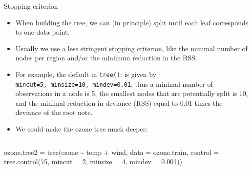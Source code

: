\documentclass[
  10pt,
  ignorenonframetext,
]{beamer}
\newenvironment{Shaded}{\begin{snugshade}}{\end{snugshade}}
\newcommand{\AttributeTok}[1]{\textcolor[rgb]{0.77,0.63,0.00}{#1}}
\newcommand{\DecValTok}[1]{\textcolor[rgb]{0.00,0.00,0.81}{#1}}
\newcommand{\FloatTok}[1]{\textcolor[rgb]{0.00,0.00,0.81}{#1}}
\newcommand{\FunctionTok}[1]{\textcolor[rgb]{0.00,0.00,0.00}{#1}}
\newcommand{\NormalTok}[1]{#1}
\newcommand{\OtherTok}[1]{\textcolor[rgb]{0.56,0.35,0.01}{#1}}
\newcommand{\SpecialCharTok}[1]{\textcolor[rgb]{0.00,0.00,0.00}{#1}}
\providecommand{\tightlist}{%
  \setlength{\itemsep}{0pt}\setlength{\parskip}{0pt}}
\begin{document}
\begin{frame}[fragile]
\begin{block}{Stopping criterion}
\protect\hypertarget{stopping-criterion}{}
\vspace{2mm}

\begin{itemize}
\tightlist
\item
  When building the tree, we can (in principle) split until each leaf
  corresponds to one data point.
\end{itemize}

\vspace{2mm}

\begin{itemize}
\tightlist
\item
  Usually we use a less stringent stopping criterion, like the minimal
  number of nodes per region and/or the minimum reduction in the RSS.
\end{itemize}

\vspace{2mm}

\begin{itemize}
\tightlist
\item
  For example, the default in \texttt{tree()}: is given by
  \texttt{mincut=5,\ minsize=10,\ mindev=0.01}, thus a minimal number of
  observations in a node is 5, the smallest nodes that are potentially
  split is 10, and the minimal reduction in deviance (RSS) equal to 0.01
  times the deviance of the root note.
\end{itemize}

\vspace{2mm}

\begin{itemize}
\tightlist
\item
  We could make the ozone tree much deeper:
\end{itemize}

\(~\)

\scriptsize

\begin{Shaded}
\begin{Highlighting}[]
\NormalTok{ozone.tree2 }\OtherTok{=} \FunctionTok{tree}\NormalTok{(ozone }\SpecialCharTok{\textasciitilde{}}\NormalTok{ temp }\SpecialCharTok{+}\NormalTok{ wind, }\AttributeTok{data =}\NormalTok{ ozone.train, }\AttributeTok{control =} \FunctionTok{tree.control}\NormalTok{(}\DecValTok{75}\NormalTok{,}
    \AttributeTok{mincut =} \DecValTok{2}\NormalTok{, }\AttributeTok{minsize =} \DecValTok{4}\NormalTok{, }\AttributeTok{mindev =} \FloatTok{0.001}\NormalTok{))}
\end{Highlighting}
\end{Shaded}
\end{block}
\end{frame}
\end{document}
